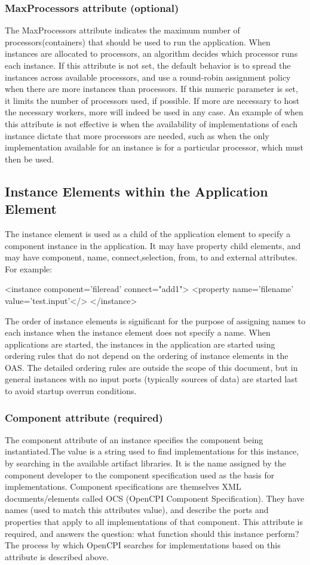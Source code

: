 \documentclass[10pt, a4paper, oneside]{article}
\renewcommand\_{\textunderscore\allowbreak} %
\begin{document}
\subsubsection{MaxProcessors attribute (optional)}The MaxProcessors attribute indicates the maximum number of processors(containers) that should be used to run the application.  When instances are allocated to processors, an algorithm decides which processor runs each instance.  If this attribute is not set, the default behavior is to spread the instances across available processors, and use a round-robin assignment policy when there are more instances than processors. If this numeric parameter is set, it limits the number of processors used, if possible.  If more are necessary to host the necessary workers, more will indeed be used in any case.  An example of when this attribute is not effective is when the availability of implementations of each instance dictate that more processors are needed, such as when the only implementation available for an instance is for a particular processor, which must then be used.
\subsection{Instance Elements within the Application Element}The instance element is used as a child of the application element to specify a component instance in the application.  It may have property child elements, and may have component, name, connect,selection, from, to and external attributes. For example:\begin{ocpixml}
<instance component='file\_read' connect="add1">
	<property name='filename' value='test.input'</>
</instance>\end{ocpixml}
The order of instance elements is significant for the purpose of assigning names to each instance when the instance element does not specify a name.  When applications are started, the instances in the application are started using ordering rules that do not depend on the ordering of instance elements in the OAS.  The detailed ordering rules are outside the scope of this document, but in general instances with no input ports (typically sources of data) are started last to avoid startup overrun conditions.
\subsubsection{Component attribute (required)} The component attribute of an instance specifies the component being instantiated.The value is a string used to find implementations for this instance, by searching in the available artifact libraries. It is the name assigned by the component developer to the component specification used as the basis for implementations.  Component specifications are themselves XML documents/elements called OCS (OpenCPI Component Specification). They have names (used to match this attributes value), and describe the ports and properties that apply to all implementations of that component. This attribute is required, and answers the question: what function should this instance perform? The process by which OpenCPI searches for implementations based on this attribute is described above. \\
\end{document}
